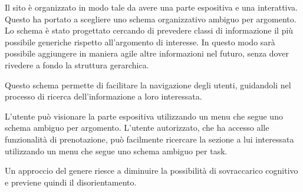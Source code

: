 Il sito è organizzato in modo tale da avere una parte espositiva e una interattiva.
Questo ha portato a scegliere uno schema organizzativo ambiguo per argomento. Lo schema è stato progettato cercando di prevedere classi di informazione il più possibile generiche rispetto all'argomento di interesse. In questo modo sarà possibile aggiungere in maniera agile altre informazioni nel futuro, senza dover rivedere a fondo la struttura gerarchica.

Questo schema permette di facilitare la navigazione degli utenti, guidandoli nel processo di ricerca dell'informazione a loro interessata. 

L'utente può visionare la parte espositiva utilizzando un menu che segue uno schema ambiguo per argomento. L'utente autorizzato, che ha accesso alle funzionalità di prenotazione, può facilmente ricercare la sezione a lui interessata utilizzando un menu che segue uno schema ambiguo per task.

Un approccio del genere riesce a diminuire la possibilità di sovraccarico cognitivo e previene quindi il disorientamento.